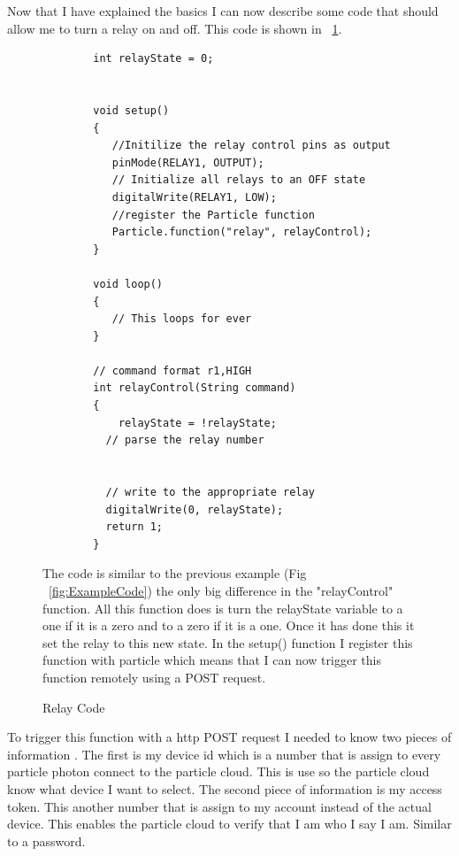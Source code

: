 \documentclass{article}
\begin{document}
Now that I have explained the basics I can now describe some code that should allow me to turn
a relay on and off. This code is shown in ~\ref{fig:relayTest}.
\begin{figure}
    \begin{lstlisting}
        int relayState = 0;
        
        
        void setup()
        {
           //Initilize the relay control pins as output
           pinMode(RELAY1, OUTPUT);
           // Initialize all relays to an OFF state
           digitalWrite(RELAY1, LOW);
           //register the Particle function
           Particle.function("relay", relayControl);
        }
        
        void loop()
        {
           // This loops for ever
        }
        
        // command format r1,HIGH
        int relayControl(String command)
        {
            relayState = !relayState;
          // parse the relay number
        
        
          // write to the appropriate relay
          digitalWrite(0, relayState);
          return 1;
        }
    \end{lstlisting}
    \caption{Relay Code} \label{fig:relayTest}
    \vspace{0.5cm}
    The code is similar to the previous example (Fig ~\ref{fig:ExampleCode}) the only big
    difference in the "relayControl" function. All this function does is turn the relayState
    variable to a one if it is a zero and to a zero if it is a one. Once it has done this it
    set the relay to this new state. In the setup() function I register this function with
    particle which means that I can now trigger this function remotely using a POST request.
\end{figure}

To trigger this function with a http POST request I needed to know two pieces of information
. The first is my device id which is a number that is assign to every particle photon connect
to the particle cloud. This is use so the particle cloud know what device I want to select.
The second piece of information is my access token. This another number that is assign to
my account instead of the actual device. This enables the particle cloud to verify that I
am who I say I am. Similar to a password.
\end{document}
